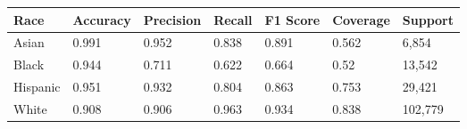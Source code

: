 \begin{tabular}{lllllll}
\toprule
Race & Accuracy & Precision & Recall & F1 Score & Coverage & Support \\
\midrule
Asian & 0.991 & 0.952 & 0.838 & 0.891 & 0.562 & 6,854 \\
Black & 0.944 & 0.711 & 0.622 & 0.664 & 0.52 & 13,542 \\
Hispanic & 0.951 & 0.932 & 0.804 & 0.863 & 0.753 & 29,421 \\
White & 0.908 & 0.906 & 0.963 & 0.934 & 0.838 & 102,779 \\
\bottomrule
\end{tabular}
